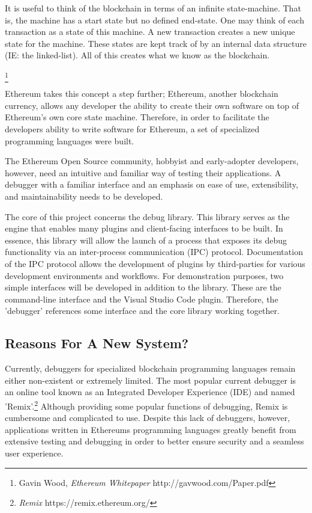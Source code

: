 \documentclass[]{article}
\begin{document}
It is useful to think of the blockchain in terms of an infinite state-machine. That is, the machine has a start state but no defined end-state. One may think of each transaction as a state of this machine. A new transaction creates a new unique state for the machine. These states are kept track of by an internal data structure (IE: the linked-list). All of this creates what we know as the blockchain.

\footnote{Gavin Wood, \textit{Ethereum Whitepaper} http://gavwood.com/Paper.pdf}

 Ethereum takes this concept a step further; Ethereum, another blockchain currency, allows any developer the ability to create their own software on top of Ethereum's own core state machine. Therefore, in order to facilitate the developers ability to write software for Ethereum, a set of specialized programming languages were built. 

The Ethereum Open Source community, hobbyist and early-adopter developers, however, need an intuitive and familiar way of testing their applications. A debugger with a familiar interface and an emphasis on ease of use, extensibility, and maintainability needs to be developed.

The core of this project concerns the debug library. This library serves as the engine that enables many plugins and client-facing interfaces to be built. In essence, this library will allow the launch of a process that exposes its debug functionality via an inter-process communication (IPC) protocol. Documentation of the IPC protocol allows the development of plugins by third-parties for various development environments and workflows. For demonstration purposes, two simple interfaces will be developed in addition to the library. These are the command-line interface and the Visual Studio Code plugin. Therefore, the 'debugger' references some interface and the core library working together.

\subsection{Reasons For A New System?}
Currently, debuggers for specialized blockchain programming languages remain either non-existent or extremely limited. The most popular current debugger is an online tool known as an Integrated Developer Experience (IDE) and named 'Remix'.\footnote{\textit{Remix} https://remix.ethereum.org/} Although providing some popular functions of debugging, Remix is cumbersome and complicated to use. Despite this lack of debuggers, however, applications written in Ethereums programming languages greatly benefit from extensive testing and debugging in order to better ensure security and a seamless user experience.
\end{document}
